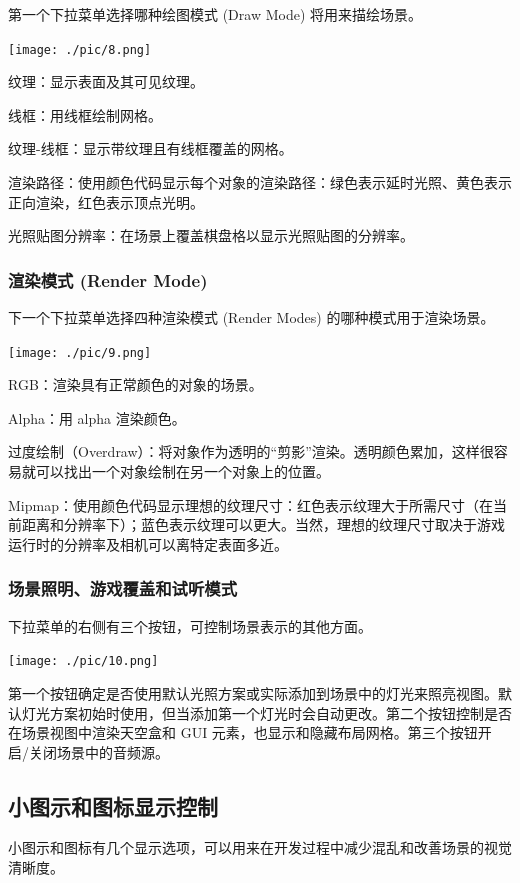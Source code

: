 \documentclass[9pt, b5paper]{article}
\begin{document}
第一个下拉菜单选择哪种绘图模式 (Draw Mode) 将用来描绘场景。

\begin{center}
\texttt{[image: ./pic/8.png]}
\end{center}
纹理：显示表面及其可见纹理。

线框：用线框绘制网格。

纹理-线框：显示带纹理且有线框覆盖的网格。

渲染路径：使用颜色代码显示每个对象的渲染路径：绿色表示延时光照、黄色表示正向渲染，红色表示顶点光明。

光照贴图分辨率：在场景上覆盖棋盘格以显示光照贴图的分辨率。

\subsubsection{渲染模式 (Render Mode)}
\label{sec:org89f5365}

下一个下拉菜单选择四种渲染模式 (Render Modes) 的哪种模式用于渲染场景。

\begin{center}
\texttt{[image: ./pic/9.png]}
\end{center}

RGB：渲染具有正常颜色的对象的场景。

Alpha：用 alpha 渲染颜色。

过度绘制（Overdraw）：将对象作为透明的“剪影”渲染。透明颜色累加，这样很容易就可以找出一个对象绘制在另一个对象上的位置。

Mipmap：使用颜色代码显示理想的纹理尺寸：红色表示纹理大于所需尺寸（在当前距离和分辨率下）；蓝色表示纹理可以更大。当然，理想的纹理尺寸取决于游戏运行时的分辨率及相机可以离特定表面多近。

\subsubsection{场景照明、游戏覆盖和试听模式}
\label{sec:org7d0af14}

下拉菜单的右侧有三个按钮，可控制场景表示的其他方面。

\begin{center}
\texttt{[image: ./pic/10.png]}
\end{center}
第一个按钮确定是否使用默认光照方案或实际添加到场景中的灯光来照亮视图。默认灯光方案初始时使用，但当添加第一个灯光时会自动更改。第二个按钮控制是否在场景视图中渲染天空盒和 GUI 元素，也显示和隐藏布局网格。第三个按钮开启/关闭场景中的音频源。

\subsection{小图示和图标显示控制}
\label{sec:org6335055}
小图示和图标有几个显示选项，可以用来在开发过程中减少混乱和改善场景的视觉清晰度。
\end{document}
